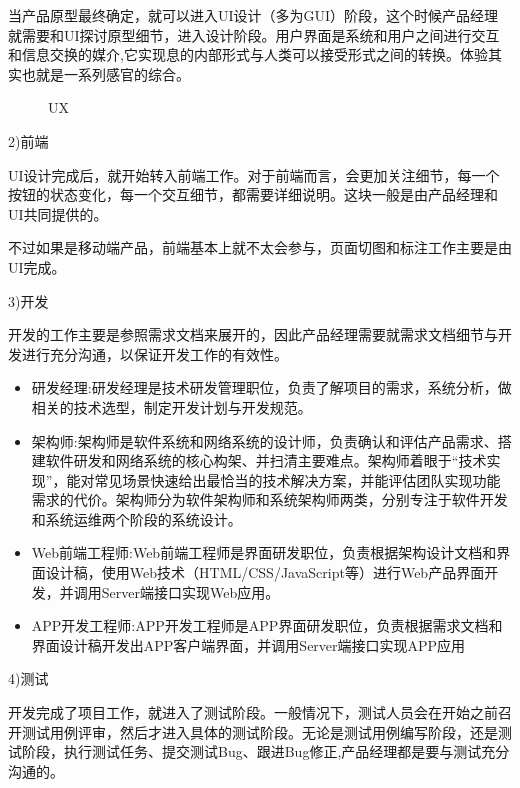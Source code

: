 \documentclass[letterpaper,11pt,english]{sphinxmanual}
\begin{document}
当产品原型最终确定，就可以进入UI设计（多为GUI）阶段，这个时候产品经理就需要和UI探讨原型细节，进入设计阶段。用户界面是系统和用户之间进行交互和信息交换的媒介,它实现息的内部形式与人类可以接受形式之间的转换。体验其实也就是一系列感官的综合。

\begin{figure}[H]
\centering
\capstart

\noindent{}
\caption{UX}\label{\detokenize{chapter_introduction/PM:id69}}\end{figure}

2)前端

UI设计完成后，就开始转入前端工作。对于前端而言，会更加关注细节，每一个按钮的状态变化，每一个交互细节，都需要详细说明。这块一般是由产品经理和UI共同提供的。

不过如果是移动端产品，前端基本上就不太会参与，页面切图和标注工作主要是由UI完成。

3)开发

开发的工作主要是参照需求文档来展开的，因此产品经理需要就需求文档细节与开发进行充分沟通，以保证开发工作的有效性。
\begin{itemize}
\item {} 
研发经理:研发经理是技术研发管理职位，负责了解项目的需求，系统分析，做相关的技术选型，制定开发计划与开发规范。

\item {} 
架构师:架构师是软件系统和网络系统的设计师，负责确认和评估产品需求、搭建软件研发和网络系统的核心构架、并扫清主要难点。架构师着眼于“技术实现”，能对常见场景快速给出最恰当的技术解决方案，并能评估团队实现功能需求的代价。架构师分为软件架构师和系统架构师两类，分别专注于软件开发和系统运维两个阶段的系统设计。

\item {} 
Web前端工程师:Web前端工程师是界面研发职位，负责根据架构设计文档和界面设计稿，使用Web技术（HTML/CSS/JavaScript等）进行Web产品界面开发，并调用Server端接口实现Web应用。

\item {} 
APP开发工程师:APP开发工程师是APP界面研发职位，负责根据需求文档和界面设计稿开发出APP客户端界面，并调用Server端接口实现APP应用

\end{itemize}

4)测试

开发完成了项目工作，就进入了测试阶段。一般情况下，测试人员会在开始之前召开测试用例评审，然后才进入具体的测试阶段。无论是测试用例编写阶段，还是测试阶段，执行测试任务、提交测试Bug、跟进Bug修正,产品经理都是要与测试充分沟通的。
\end{document}
